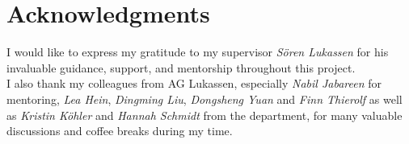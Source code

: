\section*{Acknowledgments}
I would like to express my gratitude to my supervisor \textit{Sören Lukassen} for his invaluable guidance, support, and mentorship throughout this project.
\\
I also thank my colleagues from AG Lukassen, especially \textit{Nabil Jabareen} for mentoring, \textit{Lea Hein}, \textit{Dingming Liu}, \textit{Dongsheng Yuan} and \textit{Finn Thierolf} as well as \textit{Kristin Köhler} and \textit{Hannah Schmidt} from the department, for many valuable discussions and coffee breaks during my time.
